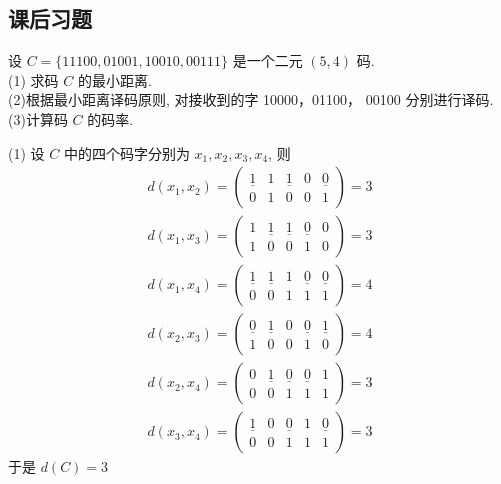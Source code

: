 \subsection{课后习题}
\begin{exercise}
     设 $ C=\{11100,01001,10010,00111\} $ 是一个二元 $ (5,4) $ 码.\\
(1) 求码 $ C $ 的最小距离.\\
(2)根据最小距离译码原则, 对接收到的字 10000，01100， 00100 分别进行译码.\\
(3)计算码 $ C $ 的码率.
\end{exercise}
\begin{solution}
    (1) 设 $ C $ 中的四个码字分别为 $ x_{1}, x_{2}, x_{3}, x_{4} $, 则
$$
\begin{array}{l}
d\left(x_{1}, x_{2}\right)=\left(\begin{array}{lllll}
\underline{1} & 1 & \underline{1} & 0 & \underline{0} \\
0 & 1 & 0 & 0 & 1
\end{array}\right)=3 \\
d\left(x_{1}, x_{3}\right)=\left(\begin{array}{lllll}
1 & \underline{1} & \underline{1} & \underline{0} & 0 \\
1 & 0 & 0 & 1 & 0
\end{array}\right)=3
\end{array}
$$
$$
\begin{array}{l}
d\left(x_{1}, x_{4}\right)=\left(\begin{array}{ccccc}
\underline{1} & \underline{1} & 1 & \underline{0} & \underline{0} \\
0 & 0 & 1 & 1 & 1
\end{array}\right)=4 \\
d\left(x_{2}, x_{3}\right)=\left(\begin{array}{ccccc}
\underline{0} & \underline{1} & 0 & \underline{0} & \underline{1} \\
1 & 0 & 0 & 1 & 0
\end{array}\right)=4 \\
d\left(x_{2}, x_{4}\right)=\left(\begin{array}{ccccc}
0 & \underline{1} & \underline{0} & \underline{0} & 1 \\
0 & 0 & 1 & 1 & 1
\end{array}\right)=3 \\
d\left(x_{3}, x_{4}\right)=\left(\begin{array}{ccccc}
\underline{1} & 0 & \underline{0} & 1 & \underline{0} \\
0 & 0 & 1 & 1 & 1
\end{array}\right)=3
\end{array}
$$
于是 $ d(C)=3 $


\end{solution}
